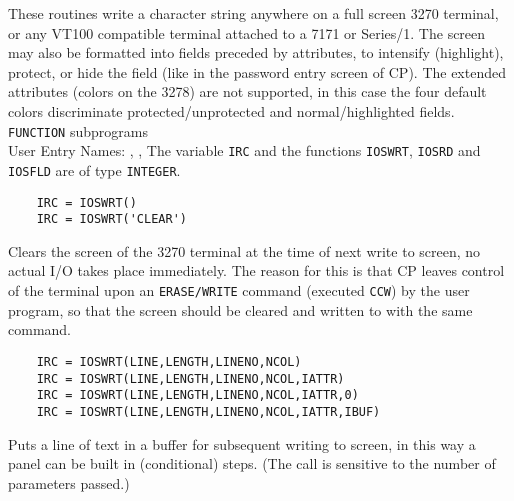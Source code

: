                  
                
\Submitter{}                       
These routines write a character string anywhere on a full
screen 3270 terminal, or any VT100 compatible terminal attached to
a 7171 or Series/1.
The screen may also be formatted into fields preceded by attributes,
to intensify (highlight), protect, or hide the field
(like in the password entry screen of CP).
The extended attributes (colors on the 3278) are not supported,
in this case the four default colors discriminate
protected/unprotected and normal/highlighted fields.
\Structure
{\tt FUNCTION} subprograms \\
User Entry Names: , , 
\Usage
The variable {\tt IRC} and the functions {\tt IOSWRT}, {\tt IOSRD}
and {\tt IOSFLD} are of type {\tt INTEGER}.
\begin{verbatim}
    IRC = IOSWRT()
    IRC = IOSWRT('CLEAR')
\end{verbatim}
Clears the screen of the 3270 terminal at the time of next write to
screen, no actual I/O takes place immediately.
The reason for this is that CP leaves control of the terminal upon
an {\tt ERASE/WRITE} command (executed {\tt CCW}) by the user program,
so that the screen should be cleared and written to with the same
command.
\begin{verbatim}
    IRC = IOSWRT(LINE,LENGTH,LINENO,NCOL)
    IRC = IOSWRT(LINE,LENGTH,LINENO,NCOL,IATTR)
    IRC = IOSWRT(LINE,LENGTH,LINENO,NCOL,IATTR,0)
    IRC = IOSWRT(LINE,LENGTH,LINENO,NCOL,IATTR,IBUF)
\end{verbatim}
Puts a line of text in a buffer for subsequent writing to screen,
in this way a panel can be built in (conditional) steps.
(The call is sensitive to the number of parameters passed.)
